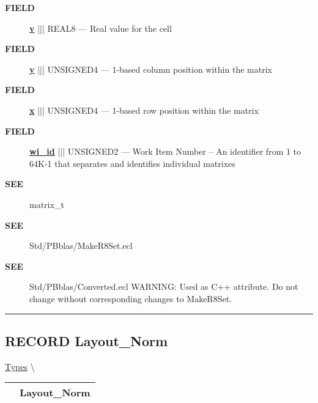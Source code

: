 \par
\begin{description}
\item [\colorbox{tagtype}{\color{white} \textbf{\textsf{FIELD}}}] \textbf{\underline{v}} ||| REAL8 --- Real value for the cell
\item [\colorbox{tagtype}{\color{white} \textbf{\textsf{FIELD}}}] \textbf{\underline{y}} ||| UNSIGNED4 --- 1-based column position within the matrix
\item [\colorbox{tagtype}{\color{white} \textbf{\textsf{FIELD}}}] \textbf{\underline{x}} ||| UNSIGNED4 --- 1-based row position within the matrix
\item [\colorbox{tagtype}{\color{white} \textbf{\textsf{FIELD}}}] \textbf{\underline{wi\_id}} ||| UNSIGNED2 --- Work Item Number -- An identifier from 1 to 64K-1 that separates and identifies individual matrixes
\end{description}







\par
\begin{description}
\item [\colorbox{tagtype}{\color{white} \textbf{\textsf{SEE}}}] matrix\_t
\item [\colorbox{tagtype}{\color{white} \textbf{\textsf{SEE}}}] Std/PBblas/MakeR8Set.ecl
\item [\colorbox{tagtype}{\color{white} \textbf{\textsf{SEE}}}] Std/PBblas/Converted.ecl WARNING: Used as C++ attribute. Do not change without corresponding changes to MakeR8Set.
\end{description}




\rule{\linewidth}{0.5pt}
\subsection*{\textsf{\colorbox{headtoc}{\color{white} RECORD}
Layout\_Norm}}

\hypertarget{ecldoc:pbblas.types.layout_norm}{}
\hspace{0pt} \hyperlink{ecldoc:PBblas.Types}{Types} \textbackslash 

{\renewcommand{\arraystretch}{1.5}
\begin{tabularx}{\textwidth}{|>{\raggedright\arraybackslash}l|X|}
\hline
\hspace{0pt}\mytexttt{\color{red} } & \textbf{Layout\_Norm} \\
\hline
\end{tabularx}
}

